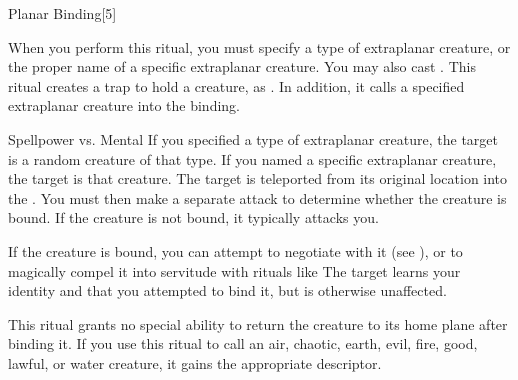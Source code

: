 \begin{spellsection}[Lesser]{Planar Binding}[5]
    \begin{spellheader}
    \end{spellheader}
    \begin{spellcontent}
        \begin{spelltargetinginfo}
        \end{spelltargetinginfo}
        \begin{spelleffects}

            \spellspecial When you perform this ritual, you must specify a type of extraplanar creature, or the proper name of a specific extraplanar creature. You may also cast .
            \spelleffect This ritual creates a trap to hold a creature, as . In addition, it calls a specified extraplanar creature into the binding.
            \begin{spellattack}{Spellpower vs. Mental}
                \spellspecial If you specified a type of extraplanar creature, the target is a random creature of that type. If you named a specific extraplanar creature, the target is that creature.
                \spellsuccess The target is teleported from its original location into the . You must then make a separate attack to determine whether the creature is bound. If the creature is not bound, it typically attacks you.

                If the creature is bound, you can attempt to negotiate with it (see ), or to magically compel it into servitude with rituals like 
                \spellfailure The target learns your identity and that you attempted to bind it, but is otherwise unaffected.
            \end{spellattack}
        \end{spelleffects}
    \end{spellcontent}
    \begin{spellfooter}
        \spellnotes This ritual grants no special ability to return the creature to its home plane after binding it. If you use this ritual to call an air, chaotic, earth, evil, fire, good, lawful, or water creature, it gains the appropriate descriptor.
    \end{spellfooter}
\end{spellsection}

